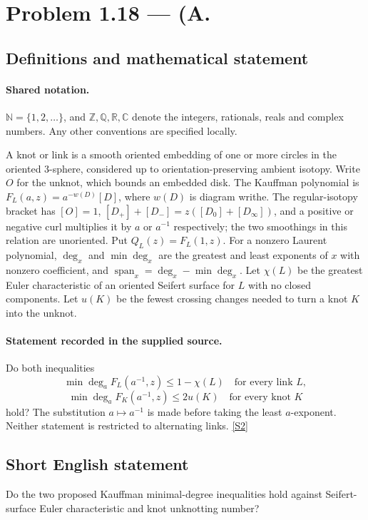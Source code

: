 \documentclass[11pt]{article}
\newcommand{\sref}[2]{\hyperlink{source:#1:#2}{[S#2]}}
\begin{document}
\section{Problem 1.18 — (A.}\label{statement}

\subsection{Definitions and mathematical statement}

\paragraph{Shared notation.}$\mathbb N=\{1,2,\ldots\}$, and $\mathbb Z,\mathbb Q,\mathbb R,\mathbb C$ denote the integers, rationals, reals and complex numbers. Any other conventions are specified locally.


A knot or link is a smooth oriented embedding of one or more circles in the oriented $3$-sphere, considered up to orientation-preserving ambient isotopy. Write $O$ for the unknot, which bounds an embedded disk. The Kauffman polynomial is $F_L(a,z)=a^{-w(D)}[D]$, where $w(D)$ is diagram writhe. The regular-isotopy bracket has $[O]=1$, $[D_+]+[D_-]=z([D_0]+[D_\infty])$, and a positive or negative curl multiplies it by $a$ or $a^{-1}$ respectively; the two smoothings in this relation are unoriented. Put $Q_L(z)=F_L(1,z)$. For a nonzero Laurent polynomial, $\deg_x$ and $\min\deg_x$ are the greatest and least exponents of $x$ with nonzero coefficient, and $\operatorname{span}_x=\deg_x-\min\deg_x$. Let $\chi(L)$ be the greatest Euler characteristic of an oriented Seifert surface for $L$ with no closed components. Let $u(K)$ be the fewest crossing changes needed to turn a knot $K$ into the unknot.
\paragraph{Statement recorded in the supplied source.}
Do both inequalities
\[\min\deg_aF_L(a^{-1},z)\le1-\chi(L)\quad\text{for every link }L,\]
\[\min\deg_aF_K(a^{-1},z)\le2u(K)\quad\text{for every knot }K\]
hold? The substitution $a\mapsto a^{-1}$ is made before taking the least $a$-exponent. Neither statement is restricted to alternating links. \sref{statement}{2}
\subsection{Short English statement}
Do the two proposed Kauffman minimal-degree inequalities hold against Seifert-surface Euler characteristic and knot unknotting number?
\end{document}
